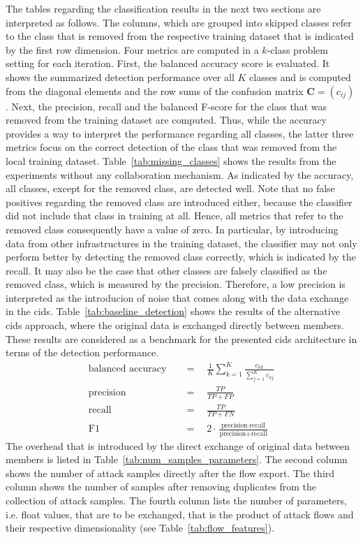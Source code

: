 \documentclass[../../main.tex]{subfiles}
\begin{document}
The tables regarding the classification results in the next two sections are interpreted as follows. The columns, which are grouped into skipped classes refer to the class that is removed from the respective training dataset that is indicated by the first row dimension. Four metrics are computed in a $k$-class problem setting for each iteration. First, the balanced accuracy score is evaluated. It shows the summarized detection performance over all $K$ classes and is computed from the diagonal elements and the row sums of the confusion matrix $\mathbf{C} = (c_{ij})$. Next, the precision, recall and the balanced F-score for the class that was removed from the training dataset are computed. Thus, while the accuracy provides a way to interpret the performance regarding all classes, the latter three metrics focus on the correct detection of the class that was removed from the local training dataset. Table~\ref{tab:missing_classes} shows the results from the experiments without any collaboration mechanism. As indicated by the accuracy, all classes, except for the removed class, are detected well. Note that no false positives regarding the removed class are introduced either, because the classifier did not include that class in training at all. Hence, all metrics that refer to the removed class consequently have a value of zero. In particular, by introducing data from other infrastructures in the training dataset, the classifier may not only perform better by detecting the removed class correctly, which is indicated by the recall. It may also be the case that other classes are falsely classified as the removed class, which is measured by the precision. Therefore, a low precision is interpreted as the introducion of noise that comes along with the data exchange in the \gls{cids}. Table~\ref{tab:baseline_detection} shows the results of the alternative \gls{cids} approach, where the original data is exchanged directly between members. These results are considered as a benchmark for the presented \gls{cids} architecture in terms of the detection performance. 
\begin{align*}
    \text{balanced accuracy} \quad &= \quad \frac{1}{K} \sum\limits_{k=1}^K \frac{c_{kk}}{\sum_{j=1}^K c_{kj}} \\
    \text{precision} \quad &= \quad \frac{TP}{TP + FP} \\
    \text{recall} \quad &= \quad \frac{TP}{TP + FN} \\
    \text{F1} \quad &= \quad 2 \cdot \frac{\text{precision} \cdot \text{recall}}{\text{precision} + \text{recall}}
\end{align*}
The overhead that is introduced by the direct exchange of original data between members is listed in Table~\ref{tab:num_samples_parameters}. The second column shows the number of attack samples directly after the flow export. The third column shows the number of samples after removing duplicates from the collection of attack samples. The fourth column lists the number of parameters, i.e. float values, that are to be exchanged, that is the product of attack flows and their respective dimensionality (see Table~\ref{tab:flow_features}).
\end{document}
